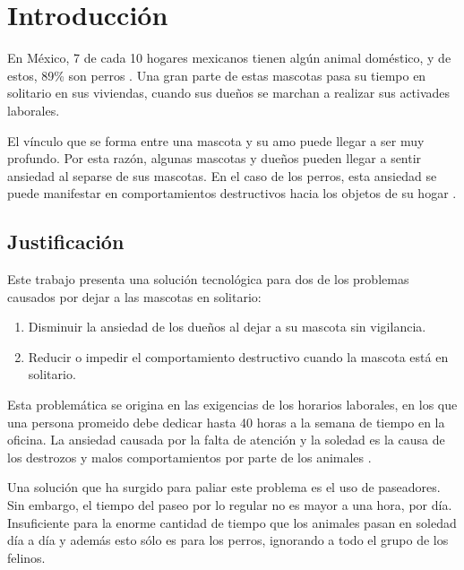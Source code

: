 \section{Introducción}

En México, 7 de cada 10 hogares mexicanos tienen algún animal doméstico, y de estos, 89\% son perros \parencite{inegi2016}. Una gran parte de estas mascotas pasa su tiempo en solitario en sus viviendas, cuando sus dueños se marchan a realizar sus activades laborales.

El vínculo que se forma entre una mascota y su amo puede llegar a ser muy profundo. Por esta razón, algunas mascotas y dueños pueden llegar a sentir ansiedad al separse de sus mascotas. En el caso de los perros, esta ansiedad se puede manifestar en comportamientos destructivos hacia los objetos de su hogar \parencite{parthasarathy2006}. 


\subsection{Justificación}
\label{sec:justificacion}

Este trabajo presenta una solución tecnológica para dos de los problemas causados por dejar a las mascotas en solitario:

\begin{enumerate}
  \item Disminuir la ansiedad de los dueños al dejar a su mascota sin vigilancia.
  \item Reducir o impedir el comportamiento destructivo cuando la mascota está en solitario. 
\end{enumerate}

Esta problemática se origina en las exigencias de los horarios laborales, en los que una persona promeido debe dedicar hasta 40 horas a la
semana de tiempo en la oficina. La ansiedad causada por la falta de atención y la soledad es la causa de los destrozos y malos comportamientos por parte de los animales \parencite{ibanes2022}.

Una solución que ha surgido para paliar este problema es el uso de paseadores. Sin embargo, el tiempo del paseo por lo regular no es mayor a una hora, por día. Insuficiente para la enorme cantidad de tiempo que los animales pasan en soledad día a día y además esto sólo es para los perros, ignorando a todo el grupo de los felinos.


